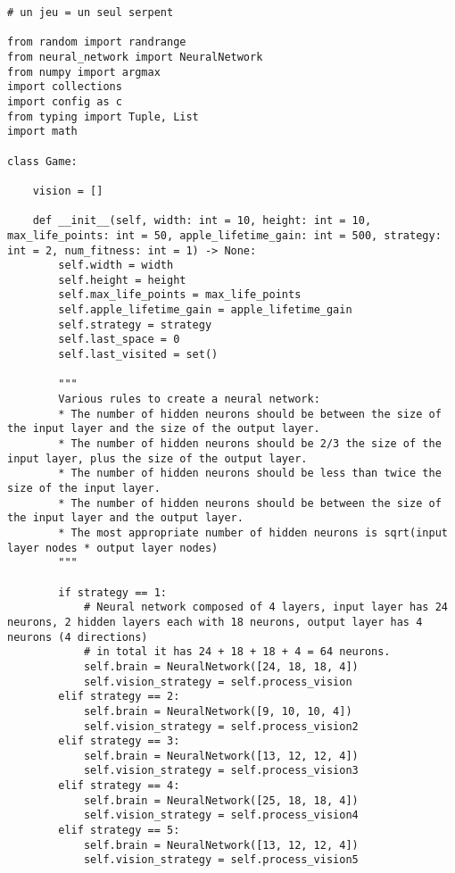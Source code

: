 \documentclass[11pt,a4paper]{article}
\begin{document}
\begin{verbatim}
# un jeu = un seul serpent

from random import randrange
from neural_network import NeuralNetwork
from numpy import argmax
import collections
import config as c
from typing import Tuple, List
import math

class Game:

    vision = []

    def __init__(self, width: int = 10, height: int = 10, max_life_points: int = 50, apple_lifetime_gain: int = 500, strategy: int = 2, num_fitness: int = 1) -> None:
        self.width = width
        self.height = height
        self.max_life_points = max_life_points
        self.apple_lifetime_gain = apple_lifetime_gain
        self.strategy = strategy
        self.last_space = 0
        self.last_visited = set()

        """
        Various rules to create a neural network:
        * The number of hidden neurons should be between the size of the input layer and the size of the output layer.
        * The number of hidden neurons should be 2/3 the size of the input layer, plus the size of the output layer.
        * The number of hidden neurons should be less than twice the size of the input layer.
        * The number of hidden neurons should be between the size of the input layer and the output layer.
        * The most appropriate number of hidden neurons is sqrt(input layer nodes * output layer nodes)
        """

        if strategy == 1:
            # Neural network composed of 4 layers, input layer has 24 neurons, 2 hidden layers each with 18 neurons, output layer has 4 neurons (4 directions)
            # in total it has 24 + 18 + 18 + 4 = 64 neurons.
            self.brain = NeuralNetwork([24, 18, 18, 4])
            self.vision_strategy = self.process_vision
        elif strategy == 2:
            self.brain = NeuralNetwork([9, 10, 10, 4])
            self.vision_strategy = self.process_vision2
        elif strategy == 3:
            self.brain = NeuralNetwork([13, 12, 12, 4])
            self.vision_strategy = self.process_vision3
        elif strategy == 4:
            self.brain = NeuralNetwork([25, 18, 18, 4])
            self.vision_strategy = self.process_vision4
        elif strategy == 5:
            self.brain = NeuralNetwork([13, 12, 12, 4])
            self.vision_strategy = self.process_vision5


\end{verbatim}
\end{document}
